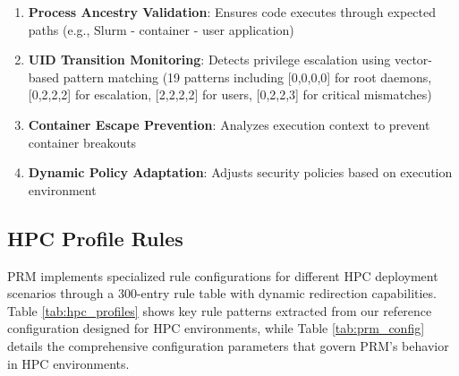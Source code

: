 \documentclass[conference]{IEEEtran}
\begin{document}
\begin{enumerate}
\item \textbf{Process Ancestry Validation}: Ensures code executes through expected paths (e.g., Slurm - container - user application)
\item \textbf{UID Transition Monitoring}: Detects privilege escalation using vector-based pattern matching (19 patterns including [0,0,0,0] for root daemons, [0,2,2,2] for escalation, [2,2,2,2] for users, [0,2,2,3] for critical mismatches)
\item \textbf{Container Escape Prevention}: Analyzes execution context to prevent container breakouts
\item \textbf{Dynamic Policy Adaptation}: Adjusts security policies based on execution environment
\end{enumerate}

\subsection{HPC Profile Rules}
PRM implements specialized rule configurations for different HPC deployment scenarios through a 300-entry rule table with dynamic redirection capabilities. Table \ref{tab:hpc_profiles} shows key rule patterns extracted from our reference configuration designed for HPC environments, while Table \ref{tab:prm_config} details the comprehensive configuration parameters that govern PRM's behavior in HPC environments.
\end{document}
